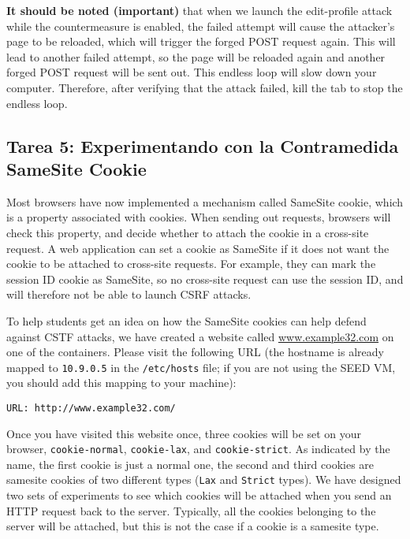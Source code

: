 \textbf{It should be noted (important)} that when we launch the edit-profile attack
while the countermeasure is enabled, the failed attempt will
cause the attacker's page to be reloaded, which will
trigger the forged POST request again. This will lead to another 
failed attempt, so the page will be reloaded again and 
another forged POST request will be sent out. This endless loop
will slow down your computer. Therefore, after verifying that 
the attack failed, kill the tab to stop the endless loop. 



\subsection{Tarea 5: Experimentando con la Contramedida SameSite Cookie} 

Most browsers have now implemented a mechanism called SameSite cookie, 
which is a property associated with cookies. When sending out 
requests, browsers will check this property, and decide whether 
to attach the cookie in a cross-site request. A web application can
set a cookie as SameSite if it does not want the cookie to be 
attached to cross-site requests. For example, they can mark
the session ID cookie as SameSite, so no cross-site request
can use the session ID, and will therefore not be able to 
launch CSRF attacks. 


To help students get an idea on how the SameSite cookies can
help defend against CSTF attacks, we have created a website
called \url{www.example32.com} on one of the containers. Please 
visit the following URL (the hostname is already mapped 
to \texttt{10.9.0.5} in the \texttt{/etc/hosts} file; if you are 
not using the SEED VM, you should add this mapping to your machine): 

\begin{lstlisting}
URL: http://www.example32.com/
\end{lstlisting}

Once you have visited this website once, three cookies will be 
set on your browser, \texttt{cookie-normal}, \texttt{cookie-lax},
and \texttt{cookie-strict}. As indicated by the name,
the first cookie is just a normal one, the second and third cookies
are samesite cookies of two different types (\texttt{Lax} and \texttt{Strict}
types). We have designed two sets of experiments to see 
which cookies will be attached when you send an HTTP request
back to the server. Typically, all the cookies belonging to the server
will be attached, but this is not the case if a cookie is a samesite type. 


